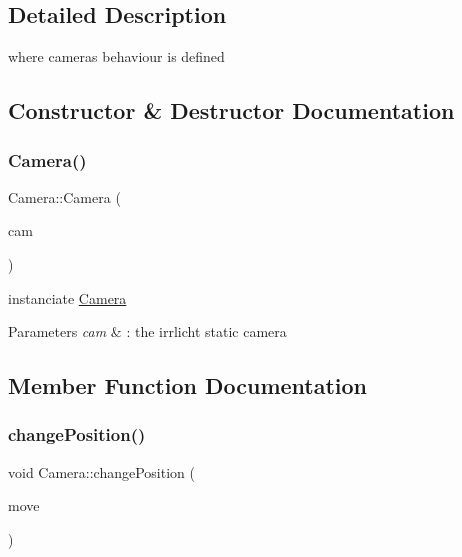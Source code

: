 \subsection{Detailed Description}
where cameras behaviour is defined 

\subsection{Constructor \& Destructor Documentation}
\mbox{\label{classCamera_a4ffc956956f49716d7fa3bff2591cd3a}} 
\subsubsection{\texorpdfstring{Camera()}{Camera()}}
{\footnotesize\ttfamily Camera\+::\+Camera (\begin{DoxyParamCaption}\item[{\hyperlink{classirr_1_1scene_1_1ICameraSceneNode}{irr\+::scene\+::\+I\+Camera\+Scene\+Node} $\ast$const}]{cam }\end{DoxyParamCaption})}



instanciate \hyperlink{classCamera}{Camera} 


\begin{DoxyParams}{Parameters}
{\em cam} & \+: the irrlicht static camera \\
\hline
\end{DoxyParams}


\subsection{Member Function Documentation}
\mbox{\label{classCamera_ad7d58a7f1ab2b31f120a0bdad677b300}} 
\subsubsection{\texorpdfstring{change\+Position()}{changePosition()}}
{\footnotesize\ttfamily void Camera\+::change\+Position (\begin{DoxyParamCaption}\item[{\hyperlink{namespaceirr_1_1core_a06f169d08b5c429f5575acb7edbad811}{irr\+::core\+::vector3df}}]{move }\end{DoxyParamCaption})}



